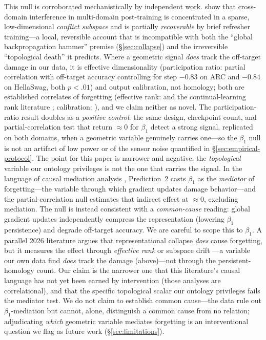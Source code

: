 \documentclass{article}
\begin{document}
This null is corroborated mechanistically by independent work. \citet{Yang2026localrl} show
that cross-domain interference in multi-domain post-training is concentrated in a sparse,
low-dimensional \emph{conflict subspace} and is partially \emph{recoverable} by brief refresher
training---a local, reversible account that is incompatible with both the ``global
backpropagation hammer'' premise (\S\ref{sec:collapse}) and the irreversible ``topological
death'' it predicts. Where a geometric signal \emph{does} track the off-target damage in our
data, it is effective dimensionality (participation ratio: partial correlation with off-target
accuracy controlling for step $-0.83$ on ARC and $-0.84$ on HellaSwag, both $p<.01$) and output
calibration, not homology; both are established correlates of forgetting (effective rank:
\citet{Aghajanyan2021intrinsic} and the continual-learning rank literature \citep{erankCF};
calibration: \citep{calibrationCF}), and we claim neither as novel. The participation-ratio result
doubles as a \emph{positive control}: the same design, checkpoint count, and partial-correlation
test that return $\approx 0$ for $\beta_1$ detect a strong signal, replicated on both domains, when
a geometric variable genuinely carries one---so the $\beta_1$ null is not an artifact of low power
or of the sensor noise quantified in \S\ref{sec:empirical-protocol}. The point for this paper is
narrower and negative: the \emph{topological} variable our ontology privileges is not the one that
carries the signal.
In the language of causal mediation analysis \citep{Vig2020causal,MuellerMediator2024},
Prediction~2 casts $\beta_1$ as the \emph{mediator} of forgetting---the variable through which
gradient updates damage behavior---and the partial-correlation null estimates that indirect effect
at $\approx 0$, excluding mediation. The null is instead consistent with a \emph{common-cause}
reading: global gradient updates independently compress the representation (lowering $\beta_1$
persistence) and degrade off-target accuracy. We are careful to scope this to $\beta_1$. A parallel
2026 literature argues that representational collapse \emph{does} cause forgetting, but it measures
the effect through \emph{effective rank} or subspace drift \citep{erankCF,Imanov2026forgetting}---a
variable our own data find \emph{does} track the damage (above)---not through the persistent-homology
count. Our claim is the narrower one that this literature's causal language has not yet been
earned by intervention (those analyses are correlational), and that the specific topological scalar
our ontology privileges fails the mediator test. We do not claim to establish common cause---the
data rule out $\beta_1$-mediation but cannot, alone, distinguish a common cause from no relation;
adjudicating \emph{which} geometric variable mediates forgetting is an interventional question we
flag as future work (\S\ref{sec:limitations}).
\end{document}
